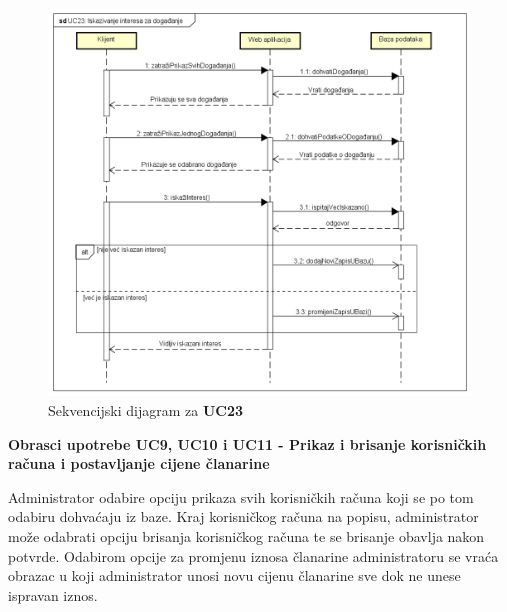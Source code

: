 				\begin{figure}[H]
					\includegraphics[width=\textwidth]{dijagrami/sd3.PNG}
					\centering
					\caption{Sekvencijski dijagram za \textbf{UC23}}
					\label{fig:promjene}
				\end{figure}
				
				\newpage
				
				\noindent \textbf{Obrasci upotrebe UC9, UC10 i UC11 - Prikaz i brisanje korisničkih računa i postavljanje cijene članarine}
				
				\noindent Administrator odabire opciju prikaza svih korisničkih računa koji se po tom odabiru dohvaćaju iz baze. Kraj korisničkog računa na popisu, administrator može odabrati opciju brisanja korisničkog računa te se brisanje obavlja nakon potvrde. Odabirom opcije za promjenu iznosa članarine administratoru se vraća obrazac u koji administrator unosi novu cijenu članarine sve dok ne unese ispravan iznos.
				
				\vspace{-0.4cm}
				

